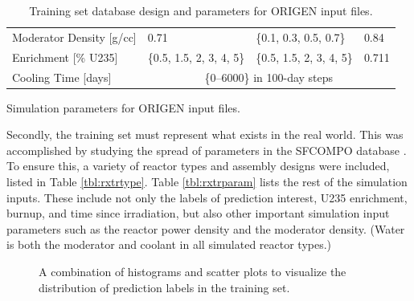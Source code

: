 \begin{table}[!htb]
\begin{subtable}{\linewidth}
\begin{tabular}{@{}llll@{}}
      Moderator Density [g/cc]  & 0.71                      & \{0.1, 0.3, 0.5, 0.7\}    & 0.84          \\
      Enrichment [\% \gls{U235}]& \{0.5, 1.5, 2, 3, 4, 5\}  & \{0.5, 1.5, 2, 3, 4, 5\}  & 0.711         \\
      Cooling Time [days]       & \multicolumn{3}{c}{\{0--6000\} in 100-day steps}                      \\ \bottomrule
    \end{tabular}
    \caption{Simulation parameters for \acrshort{ORIGEN} input files.}
    \label{tbl:rxtrparam}
  \end{subtable}%
  \caption[Training set database design for \acrshort{ORIGEN} input files.]
          {Training set database design and parameters for \acrshort{ORIGEN} 
           input files.}
  \label{tbl:train}
\end{table}

Secondly, the training set must represent what exists in the real world. This
was accomplished by studying the spread of parameters in the \gls{SFCOMPO}
database \cite{sfcompo, valid_sfco}.  To ensure this, a variety of reactor
types and assembly designs were included, listed in Table \ref{tbl:rxtrtype}.
Table \ref{tbl:rxtrparam} lists the rest of the simulation inputs. These
include not only the labels of prediction interest, \gls{U235} enrichment,
burnup, and time since irradiation, but also other important simulation input
parameters such as the reactor power density and the moderator density.  (Water
is both the moderator and coolant in all simulated reactor types.)

\begin{figure}[!hbt]
  \caption[Visualization of training set labels distributions]
          {A combination of histograms and scatter plots to visualize the 
           distribution of prediction labels in the training set.}
  \label{fig:trainhist}
\end{figure}

